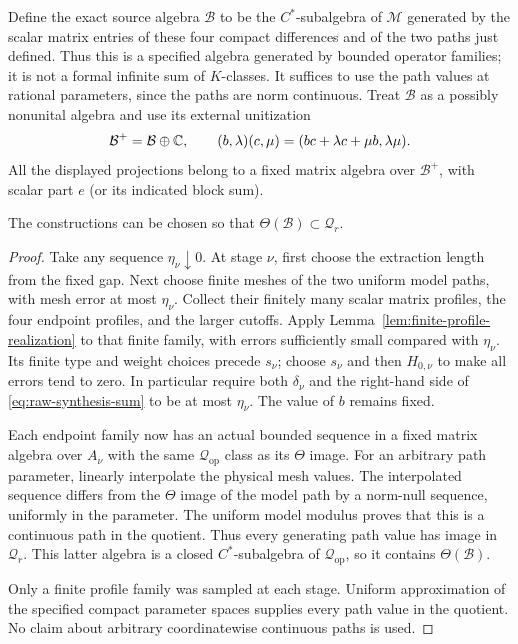 Define the exact source algebra $\mathcal B$ to be the $C^*$-subalgebra of
$\mathcal M$ generated by the scalar matrix entries of these four compact
differences and of the two paths just defined.  Thus this is a specified
algebra generated by bounded operator families; it is not a formal infinite
sum of $K$-classes.  It suffices to use the path values at rational parameters,
since the paths are norm continuous.  Treat $\mathcal B$ as a possibly
nonunital algebra and use its external unitization
\[
 \mathcal B^+=\mathcal B\oplus\mathbb C,
 \qquad (b,\lambda)(c,\mu)=(bc+\lambda c+\mu b,\lambda\mu).
\]
All the displayed projections belong to a fixed matrix algebra over
$\mathcal B^+$, with scalar part $e$ (or its indicated block sum).

\begin{lemma}
\label{lem:source-reduced-membership}
The constructions can be chosen so that
$\Theta(\mathcal B)\subset\mathcal Q_r$.
\end{lemma}

\begin{proof}
Take any sequence $\eta_\nu\downarrow0$.  At stage $\nu$, first choose the
extraction length from the fixed gap.  Next choose finite meshes of the two
uniform model paths, with mesh error at most $\eta_\nu$.  Collect their
finitely many scalar matrix profiles, the four endpoint profiles, and the
larger cutoffs.  Apply Lemma~\ref{lem:finite-profile-realization} to that
finite family, with errors sufficiently small compared with $\eta_\nu$.
Its finite type and weight choices precede $s_\nu$; choose $s_\nu$ and then
$H_{0,\nu}$ to make all errors tend to zero.  In particular require both
$\delta_\nu$ and the right-hand side of \eqref{eq:raw-synthesis-sum} to be
at most $\eta_\nu$.  The value of $b$ remains fixed.

Each endpoint family now has an actual bounded sequence in a fixed matrix
algebra over $A_\nu$ with the same $\mathcal Q_{\mathrm{op}}$ class as its
$\Theta$ image.  For an arbitrary path parameter, linearly interpolate
the physical mesh values.  The interpolated sequence differs from the
$\Theta$ image of the model path by a norm-null sequence, uniformly in the
parameter.  The uniform model modulus proves that this is a continuous
path in the quotient.  Thus every generating path value has image in
$\mathcal Q_r$.  This latter algebra is a closed $C^*$-subalgebra of
$\mathcal Q_{\mathrm{op}}$, so it contains $\Theta(\mathcal B)$.

Only a finite profile family was sampled at each stage.  Uniform approximation
of the specified compact parameter spaces supplies every path value in the
quotient.  No claim about arbitrary coordinatewise continuous paths is used.
\end{proof}

